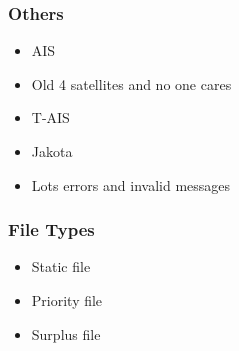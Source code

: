 \documentclass[12pt]{beamer}
\begin{document}
    \begin{frame}
        \frametitle{Others}
            \begin{itemize}
                \item AIS
                \pause
                \item Old 4 satellites and no one cares
                \pause
                \item T-AIS
                \pause
                \item Jakota
                \pause
                \item Lots errors and invalid messages
            \end{itemize}
    \end{frame}

    \begin{frame}
        \frametitle{File Types}
            \begin{itemize}
                \item Static file
                \pause
                \item Priority file
                \pause
                \item Surplus file
            \end{itemize}
    \end{frame}
\end{document}
